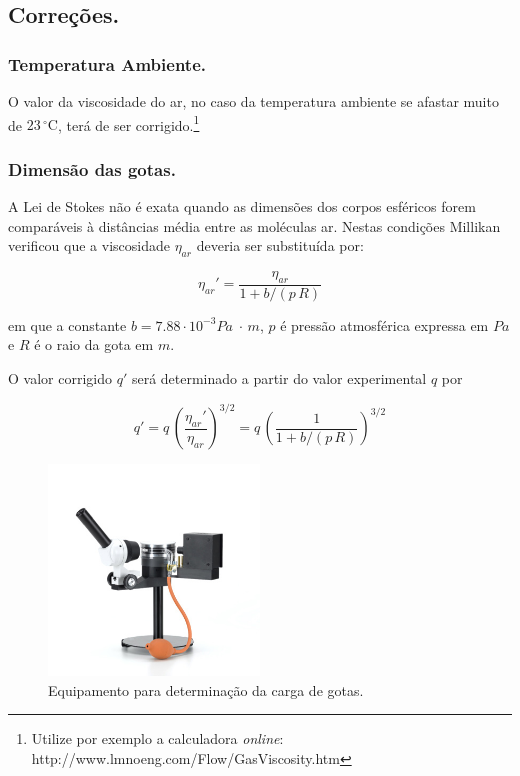 \documentclass[a4paper,twoside,12pt]{article}      %
\begin{document}
\subsection{\sf Correções.}
\subsubsection{\sf Temperatura Ambiente.}

O valor  da viscosidade do ar, no caso da temperatura ambiente se afastar muito de $23\,^{\circ}\mathrm{C}$, terá de ser corrigido.\footnote{Utilize por exemplo a calculadora \emph{online}: http://www.lmnoeng.com/Flow/GasViscosity.htm}

\subsubsection{\sf Dimensão das gotas.}

A Lei de Stokes não é exata quando as dimensões dos corpos esféricos forem comparáveis à distâncias
média entre as moléculas ar.
Nestas condições Millikan verificou que a viscosidade $\eta_{ar}$ deveria ser substituída por:

\begin{equation}
	\label{eq:correcao}
	\eta_{ar}' = \frac{\eta_{ar}}{1 + b/(p\,R)}  
\end{equation}

em que a constante $b=7.88\cdot 10^{-3}Pa\;\cdot \,m$, 
$p$ é pressão atmosférica expressa em $Pa$ e $R$ é o raio da gota em $m$.

O valor corrigido $q'$ será  determinado a partir do valor experimental $q$ por

\begin{equation}
	\label{eq:correcao1}
	q' = q\, \left(\frac{\eta_{ar}'}{\eta_{ar}}\right)^{3/2}  =q\, \left(\frac{1}{1 + b/(p\,R)}\right)^{3/2}  
\end{equation}

\begin{figure}
	[htb]  \centering 
	\includegraphics[width=0.5\textwidth]{./U131001_01_Aparelho-de-Millikan}
	\caption{Equipamento para determinação da carga de gotas. \label{fig:Equi}} 
\end{figure}
\end{document}
